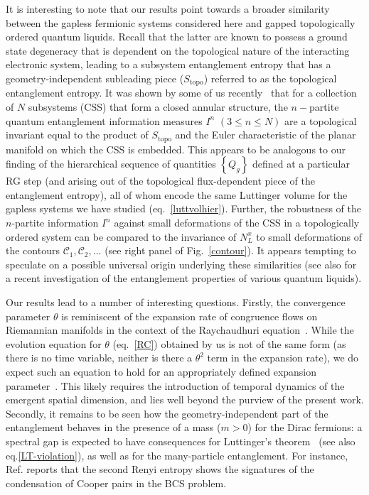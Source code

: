 It is interesting to note that our results point towards a broader similarity between the gapless fermionic systems considered here and gapped topologically ordered quantum liquids. Recall that the latter are known to possess a ground state degeneracy that is dependent on the topological nature of the interacting electronic system, leading to a subsystem entanglement entropy that has a geometry-independent subleading piece (\(S_\text{topo}\)) referred to as the topological entanglement entropy. It was shown by some of us recently~\cite{siddhartha_TEE} that for a collection of \(N\) subsystems (CSS) that form a closed annular structure, the \(n-\)partite quantum entanglement information measures \(I^n\) \((3 \leq n \leq N)\) are a topological invariant equal to the product of \(S_\text{topo}\) and the Euler characteristic of the planar manifold on which the CSS is embedded. This appears to be analogous to our finding of the hierarchical sequence of quantities \(\left\{Q_g\right\}\) defined at a particular RG step (and arising out of the topological flux-dependent piece of the entanglement entropy), all of whom encode the same Luttinger volume for the gapless systems we have studied (eq.~\eqref{luttvolhier}). Further, the robustness of the $n$-partite information \(I^n\) against small deformations of the CSS in a topologically ordered system can be compared to the invariance of \(N^x_L\) to small deformations of the contours \(\mathcal{C}_1, \mathcal{C}_2, \ldots\) (see right panel of Fig.~\ref{contour}). It appears tempting to speculate on a possible universal origin underlying these similarities (see also \cite{PatraEntanglement2023} for a recent investigation of the entanglement properties of various quantum liquids).

Our results lead to a number of interesting questions. 
Firstly, the convergence parameter \(\theta\) is reminiscent of the expansion rate of congruence flows on Riemannian manifolds in the context of the Raychaudhuri equation~\cite{kar_2001}.
While the evolution equation for \(\theta\) (eq.~\eqref{RC}) obtained by us is not of the same form (as there is no time variable, neither is there a \(\theta^2\) term in the expansion rate), we do expect such an equation to hold for an appropriately defined expansion parameter~\cite{kar2007raychaudhuri,balasubramanian1999}. This likely requires the introduction of temporal dynamics of the emergent spatial dimension, and lies well beyond the purview of the present work.
Secondly, it remains to be seen how the geometry-independent part of the entanglement behaves in the presence of a mass (\(m > 0\)) for the Dirac fermions: a spectral gap is expected to have consequences for Luttinger's theorem~\cite{anirbanurg1} (see also eq.\eqref{LT-violation}), as well as for the many-particle entanglement. For instance, Ref.\cite{flynn2022} reports that the second Renyi entropy shows the signatures of the condensation of Cooper pairs in the BCS problem.

